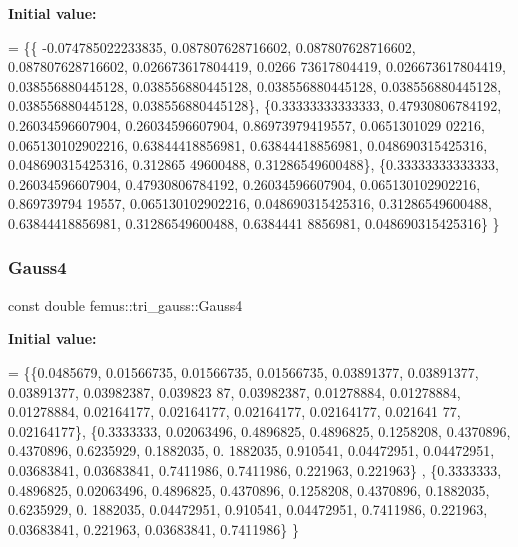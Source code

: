 {\bfseries Initial value\+:}
\begin{DoxyCode}
= \{\{ -0.074785022233835, 0.087807628716602, 0.087807628716602, 0.087807628716602, 0.026673617804419, 0.0266
      73617804419, 0.026673617804419, 0.038556880445128, 0.038556880445128, 0.038556880445128, 0.038556880445128, 
      0.038556880445128, 0.038556880445128\},
    \{0.33333333333333, 0.47930806784192, 0.26034596607904, 0.26034596607904, 0.86973979419557, 0.0651301029
      02216, 0.065130102902216, 0.63844418856981, 0.63844418856981, 0.048690315425316, 0.048690315425316, 0.312865
      49600488, 0.31286549600488\},
    \{0.33333333333333, 0.26034596607904, 0.47930806784192, 0.26034596607904, 0.065130102902216, 0.869739794
      19557, 0.065130102902216, 0.048690315425316, 0.31286549600488, 0.63844418856981, 0.31286549600488, 0.6384441
      8856981, 0.048690315425316\}
  \}
\end{DoxyCode}
\mbox{\label{classfemus_1_1tri__gauss_a9a95b70f7608299b2787acb925250ae0}} 
\subsubsection{\texorpdfstring{Gauss4}{Gauss4}}
{\footnotesize\ttfamily const double femus\+::tri\+\_\+gauss\+::\+Gauss4\hspace{0.3cm}{\ttfamily [static]}}

{\bfseries Initial value\+:}
\begin{DoxyCode}
= \{\{0.0485679, 0.01566735, 0.01566735, 0.01566735, 0.03891377, 0.03891377, 0.03891377, 0.03982387, 0.039823
      87, 0.03982387, 0.01278884, 0.01278884, 0.01278884, 0.02164177, 0.02164177, 0.02164177, 0.02164177, 0.021641
      77, 0.02164177\},
    \{0.3333333, 0.02063496, 0.4896825, 0.4896825, 0.1258208, 0.4370896, 0.4370896, 0.6235929, 0.1882035, 0.
      1882035, 0.910541, 0.04472951, 0.04472951, 0.03683841, 0.03683841, 0.7411986, 0.7411986, 0.221963, 0.221963\}
      ,
    \{0.3333333, 0.4896825, 0.02063496, 0.4896825, 0.4370896, 0.1258208, 0.4370896, 0.1882035, 0.6235929, 0.
      1882035, 0.04472951, 0.910541, 0.04472951, 0.7411986, 0.221963, 0.03683841, 0.221963, 0.03683841, 0.7411986\}
  \}
\end{DoxyCode}
\mbox{\label{classfemus_1_1tri__gauss_a40b8259641438684fa4a76b912fcb2e1}} 
